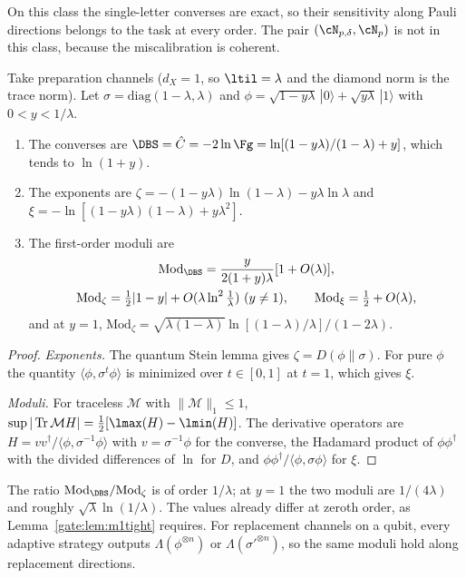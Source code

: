 On this class the single-letter converses are exact, so their sensitivity along Pauli directions belongs to the task at every order. The pair $(\cN_{p,\delta},\cN_p)$ is not in this class, because the miscalibration is coherent.

\begin{proposition}\label{gate:prop:m1gap}
Take preparation channels ($d_X=1$, so $\ltil=\lambda$ and the diamond norm is the trace norm). Let $\sigma=\mathrm{diag}(1-\lambda,\lambda)$ and $\phi=\sqrt{1-y\lambda}\,|0\rangle+\sqrt{y\lambda}\,|1\rangle$ with $0<y<1/\lambda$.
\begin{enumerate}
\item[(a)] The converses are $\DBS=\hat C=-2\ln\Fg=\ln[(1-y\lambda)/(1-\lambda)+y]$, which tends to $\ln(1+y)$.
\item[(b)] The exponents are $\zeta=-(1-y\lambda)\ln(1-\lambda)-y\lambda\ln\lambda$ and $\xi=-\ln[(1-y\lambda)(1-\lambda)+y\lambda^2]$.
\item[(c)] The first-order moduli are
\begin{equation}\label{gate:eq:m1gap}
\begin{gathered}
\mathrm{Mod}_{\DBS}=\frac{y}{2(1+y)\lambda}[1+O(\lambda)],\\
\mathrm{Mod}_\zeta=\tfrac12|1-y|+O(\lambda\ln^2\tfrac1\lambda)\ (y\neq1),\qquad \mathrm{Mod}_\xi=\tfrac12+O(\lambda),
\end{gathered}
\end{equation}
and at $y=1$, $\mathrm{Mod}_\zeta=\sqrt{\lambda(1-\lambda)}\ln[(1-\lambda)/\lambda]/(1-2\lambda)$.
\end{enumerate}
\end{proposition}

\begin{proof}
\emph{Exponents.} The quantum Stein lemma gives $\zeta=D(\phi\|\sigma)$. For pure $\phi$ the quantity $\langle\phi,\sigma^t\phi\rangle$ is minimized over $t\in[0,1]$ at $t=1$, which gives $\xi$.

\emph{Moduli.} For traceless $\mathcal M$ with $\|\mathcal M\|_1\le1$, $\sup|\Tr\mathcal M H|=\frac12[\lmax(H)-\lmin(H)]$. The derivative operators are $H=vv^\dagger/\langle\phi,\sigma^{-1}\phi\rangle$ with $v=\sigma^{-1}\phi$ for the converse, the Hadamard product of $\phi\phi^\dagger$ with the divided differences of $\ln$ for $D$, and $\phi\phi^\dagger/\langle\phi,\sigma\phi\rangle$ for $\xi$.
\end{proof}

The ratio $\mathrm{Mod}_{\DBS}/\mathrm{Mod}_\zeta$ is of order $1/\lambda$; at $y=1$ the two moduli are $1/(4\lambda)$ and roughly $\sqrt\lambda\ln(1/\lambda)$. The values already differ at zeroth order, as Lemma~\ref{gate:lem:m1tight} requires. For replacement channels on a qubit, every adaptive strategy outputs $\Lambda(\phi^{\otimes n})$ or $\Lambda(\sigma'^{\otimes n})$, so the same moduli hold along replacement directions.

